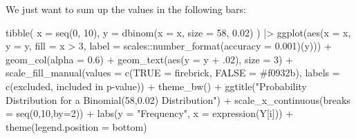 \documentclass[
  letterpaper,
  DIV=11,
  numbers=noendperiod]{scrreport}
\newenvironment{Shaded}{\begin{snugshade}}{\end{snugshade}}
\newcommand{\AttributeTok}[1]{\textcolor[rgb]{0.40,0.45,0.13}{#1}}
\newcommand{\DecValTok}[1]{\textcolor[rgb]{0.68,0.00,0.00}{#1}}
\newcommand{\FloatTok}[1]{\textcolor[rgb]{0.68,0.00,0.00}{#1}}
\newcommand{\FunctionTok}[1]{\textcolor[rgb]{0.28,0.35,0.67}{#1}}
\newcommand{\NormalTok}[1]{\textcolor[rgb]{0.00,0.23,0.31}{#1}}
\newcommand{\OtherTok}[1]{\textcolor[rgb]{0.00,0.23,0.31}{#1}}
\newcommand{\SpecialCharTok}[1]{\textcolor[rgb]{0.37,0.37,0.37}{#1}}
\newcommand{\StringTok}[1]{\textcolor[rgb]{0.13,0.47,0.30}{#1}}
\begin{document}
We just want to sum up the values in the following bars:

\begin{Shaded}
\begin{Highlighting}[]
\FunctionTok{tibble}\NormalTok{(}
  \AttributeTok{x =} \FunctionTok{seq}\NormalTok{(}\DecValTok{0}\NormalTok{, }\DecValTok{10}\NormalTok{),}
  \AttributeTok{y =} \FunctionTok{dbinom}\NormalTok{(}\AttributeTok{x =}\NormalTok{ x, }\AttributeTok{size =} \DecValTok{58}\NormalTok{, }\FloatTok{0.02}\NormalTok{)}
\NormalTok{) }\SpecialCharTok{|\textgreater{}} 
\FunctionTok{ggplot}\NormalTok{(}\FunctionTok{aes}\NormalTok{(}\AttributeTok{x =}\NormalTok{ x, }\AttributeTok{y =}\NormalTok{ y, }\AttributeTok{fill =}\NormalTok{ x }\SpecialCharTok{\textgreater{}} \DecValTok{3}\NormalTok{, }\AttributeTok{label =}\NormalTok{ scales}\SpecialCharTok{::}\FunctionTok{number\_format}\NormalTok{(}\AttributeTok{accuracy =} \FloatTok{0.001}\NormalTok{)(y))) }\SpecialCharTok{+} 
\FunctionTok{geom\_col}\NormalTok{(}\AttributeTok{alpha =} \FloatTok{0.6}\NormalTok{) }\SpecialCharTok{+} 
\FunctionTok{geom\_text}\NormalTok{(}\FunctionTok{aes}\NormalTok{(}\AttributeTok{y =}\NormalTok{ y }\SpecialCharTok{+}\NormalTok{ .}\DecValTok{02}\NormalTok{), }\AttributeTok{size =} \DecValTok{3}\NormalTok{) }\SpecialCharTok{+} 
\FunctionTok{scale\_fill\_manual}\NormalTok{(}\AttributeTok{values =} \FunctionTok{c}\NormalTok{(}\StringTok{\textasciigrave{}}\AttributeTok{TRUE}\StringTok{\textasciigrave{}} \OtherTok{=} \StringTok{\textquotesingle{}firebrick\textquotesingle{}}\NormalTok{, }\StringTok{\textasciigrave{}}\AttributeTok{FALSE}\StringTok{\textasciigrave{}} \OtherTok{=} \StringTok{\textquotesingle{}\#f0932b\textquotesingle{}}\NormalTok{),}
\AttributeTok{labels =} \FunctionTok{c}\NormalTok{(}\StringTok{\textquotesingle{}excluded\textquotesingle{}}\NormalTok{, }\StringTok{\textquotesingle{}included in p{-}value\textquotesingle{}}\NormalTok{)) }\SpecialCharTok{+} 
\FunctionTok{theme\_bw}\NormalTok{() }\SpecialCharTok{+} 
\FunctionTok{ggtitle}\NormalTok{(}\StringTok{"Probability Distribution for a Binomial(58,0.02) Distribution"}\NormalTok{) }\SpecialCharTok{+} 
\FunctionTok{scale\_x\_continuous}\NormalTok{(}\AttributeTok{breaks =} \FunctionTok{seq}\NormalTok{(}\DecValTok{0}\NormalTok{,}\DecValTok{10}\NormalTok{,}\AttributeTok{by=}\DecValTok{2}\NormalTok{)) }\SpecialCharTok{+} 
\FunctionTok{labs}\NormalTok{(}\AttributeTok{y =} \StringTok{"Frequency"}\NormalTok{, }\AttributeTok{x =} \FunctionTok{expression}\NormalTok{(Y[i])) }\SpecialCharTok{+} 
\FunctionTok{theme}\NormalTok{(}\AttributeTok{legend.position =} \StringTok{\textquotesingle{}bottom\textquotesingle{}}\NormalTok{)}
\end{Highlighting}
\end{Shaded}
\end{document}
